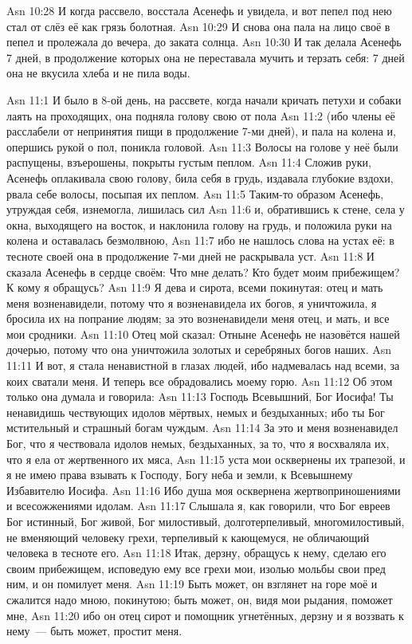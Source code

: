 \vs Asn 10:28
И когда рассвело, восстала Асенефь и увидела,
и вот пепел под нею стал от слёз её как грязь болотная.
\vs Asn 10:29
И снова она пала на лицо своё
в пепел и пролежала до вечера, до заката солнца.
\vs Asn 10:30
И так делала Асенефь 7 дней,
в продолжение которых она
не переставала мучить и терзать себя:
7 дней она не вкусила хлеба и не пила воды.

\vs Asn 11:1
И было в 8-ой день, на рассвете,
когда начали кричать петухи
и собаки лаять на проходящих,
она подняла голову свою от пола
\vs Asn 11:2
(ибо члены её расслабели от
непринятия пищи в продолжение 7-ми дней),
и пала на колена и, опершись рукой о пол,
поникла головой.
\vs Asn 11:3
Волосы на голове у неё были
распущены, взъерошены, покрыты густым пеплом.
\vs Asn 11:4
Сложив руки, Асенефь оплакивала свою голову,
била себя в грудь, издавала глубокие вздохи, рвала себе
волосы, посыпая их пеплом.
\vs Asn 11:5
Таким-то образом Асенефь,
утруждая себя, изнемогла, лишилась сил
\vs Asn 11:6
и, обратившись к стене, села у окна,
выходящего на восток, и наклонила голову на грудь,
и положила руки на колена и оставалась безмолвною,
\vs Asn 11:7
ибо не нашлось слова на устах её:
в тесноте своей она в продолжение 7-ми дней не раскрывала уст.
\vs Asn 11:8
И сказала Асенефь в сердце своём:
Что мне делать?
Кто будет моим прибежищем?
К кому я обращусь?
\vs Asn 11:9
Я дева и сирота, всеми покинутая:
отец и мать меня возненавидели, потому что я возненавидела их богов,
я уничтожила, я бросила их на попрание людям;
за это возненавидели меня отец, и мать, и все мои сродники.
\vs Asn 11:10
Отец мой сказал:
Отныне Асенефь не назовётся нашей дочерью,
потому что она уничтожила золотых и серебряных богов наших.
\vs Asn 11:11
И вот, я стала ненавистной
в глазах людей, ибо надмевалась над всеми,
за коих сватали меня.
И теперь все обрадовались моему горю.
\vs Asn 11:12
Об этом только она думала и говорила:
\vs Asn 11:13
Господь Всевышний, Бог Иосифа!
Ты ненавидишь чествующих идолов мёртвых, немых и бездыханных;
ибо ты Бог мстительный и страшный богам чуждым.
\vs Asn 11:14
За это и меня возненавидел Бог,
что я чествовала идолов немых, бездыханных,
за то, что я восхваляла их, что я ела от жертвенного их мяса,
\vs Asn 11:15
уста мои осквернены их трапезой,
и я не имею права взывать к Господу, Богу неба и земли,
к Всевышнему Избавителю Иосифа.
\vs Asn 11:16
Ибо душа моя осквернена
жертвоприношениями и всесожжениями идолам.
\vs Asn 11:17
Слышала я, как говорили,
что Бог евреев Бог истинный, Бог живой,
Бог милостивый, долготерпеливый, многомилостивый,
не вменяющий человеку грехи, терпеливый к кающемуся,
не обличающий человека в тесноте его.
\vs Asn 11:18
Итак, дерзну, обращусь к нему,
сделаю его своим прибежищем,
исповедую ему все грехи мои,
изолью мольбы свои пред ним,
и он помилует меня.
\vs Asn 11:19
Быть может, он взглянет на горе
моё и сжалится надо мною, покинутою;
быть может, он, видя мои рыдания,
поможет мне,
\vs Asn 11:20
ибо он отец сирот и помощник угнетённых,
дерзну и я воззвать к нему~--- быть может, простит меня.

